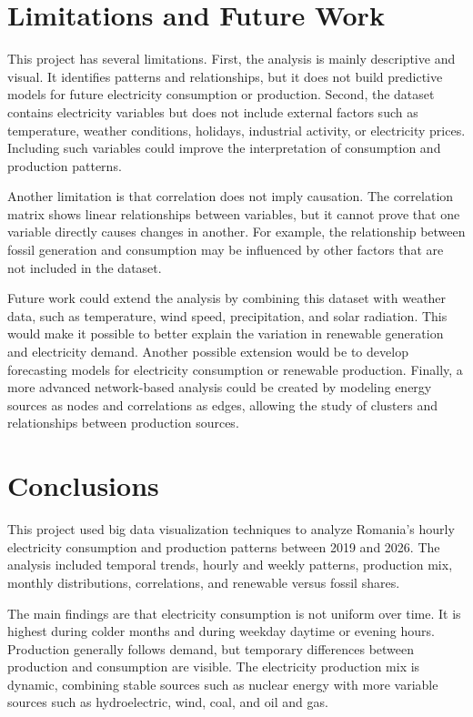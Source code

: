 \documentclass[conference]{IEEEtran}
\begin{document}
\section{Limitations and Future Work}

This project has several limitations. First, the analysis is mainly descriptive and visual. It identifies patterns and relationships, but it does not build predictive models for future electricity consumption or production. Second, the dataset contains electricity variables but does not include external factors such as temperature, weather conditions, holidays, industrial activity, or electricity prices. Including such variables could improve the interpretation of consumption and production patterns.

Another limitation is that correlation does not imply causation. The correlation matrix shows linear relationships between variables, but it cannot prove that one variable directly causes changes in another. For example, the relationship between fossil generation and consumption may be influenced by other factors that are not included in the dataset.

Future work could extend the analysis by combining this dataset with weather data, such as temperature, wind speed, precipitation, and solar radiation. This would make it possible to better explain the variation in renewable generation and electricity demand. Another possible extension would be to develop forecasting models for electricity consumption or renewable production. Finally, a more advanced network-based analysis could be created by modeling energy sources as nodes and correlations as edges, allowing the study of clusters and relationships between production sources.

\section{Conclusions}

This project used big data visualization techniques to analyze Romania's hourly electricity consumption and production patterns between 2019 and 2026. The analysis included temporal trends, hourly and weekly patterns, production mix, monthly distributions, correlations, and renewable versus fossil shares.

The main findings are that electricity consumption is not uniform over time. It is highest during colder months and during weekday daytime or evening hours. Production generally follows demand, but temporary differences between production and consumption are visible. The electricity production mix is dynamic, combining stable sources such as nuclear energy with more variable sources such as hydroelectric, wind, coal, and oil and gas.
\end{document}
